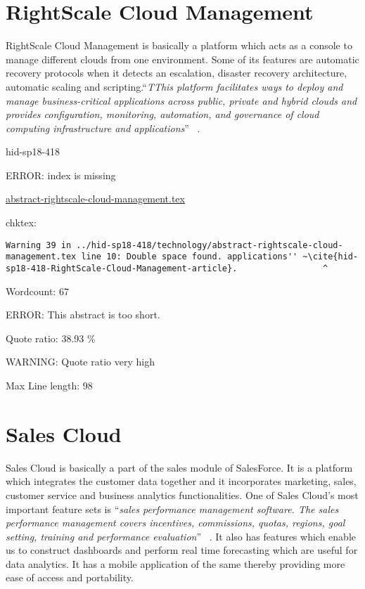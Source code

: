 \section{RightScale Cloud Management}

RightScale Cloud Management is basically a platform which acts as a console to
manage different clouds from one environment. Some of its features are
automatic recovery protocols when it detects an escalation, disaster recovery 
architecture, automatic scaling and scripting.\color{blue}``\emph{TThis platform facilitates ways 
to deploy and manage business-critical applications across public, 
private and hybrid clouds and provides configuration, monitoring, automation, 
and governance of cloud computing infrastructure and
applications}''\color{black} ~\cite{hid-sp18-418-RightScale-Cloud-Management-article}.



\begin{IU}

hid-sp18-418

ERROR: index is missing

\href{https://github.com/cloudmesh-community/hid-sp18-418/blob/master//technology/abstract-rightscale-cloud-management.tex}{abstract-rightscale-cloud-management.tex}

 
chktex:
\begin{tiny}
\begin{verbatim}
Warning 39 in ../hid-sp18-418/technology/abstract-rightscale-cloud-
management.tex line 10: Double space found. applications'' ~\cite{hid-
sp18-418-RightScale-Cloud-Management-article}.                 ^
\end{verbatim}
\end{tiny}

Wordcount: 67

ERROR: This abstract is too short.


Quote ratio: 38.93 \%

WARNING: Quote ratio very high
 
Max Line length: 98
\end{IU}

\section{Sales Cloud}

Sales Cloud is basically a part of the sales module of SalesForce. It is a 
platform which integrates the customer data together and it incorporates 
marketing, sales, customer service and business analytics functionalities.
One of Sales Cloud’s most important feature sets is \color{blue}``\emph{sales performance 
management software. The sales performance management covers incentives,
commissions, quotas, regions, goal setting, training and performance
evaluation}''\color{black} ~\cite{hid-sp18-418-Sales-Cloud-features}. It also has features 
which enable us to construct dashboards and perform real time forecasting 
which are useful for data analytics. It has a mobile application of the same 
thereby providing more ease of access and portability.


